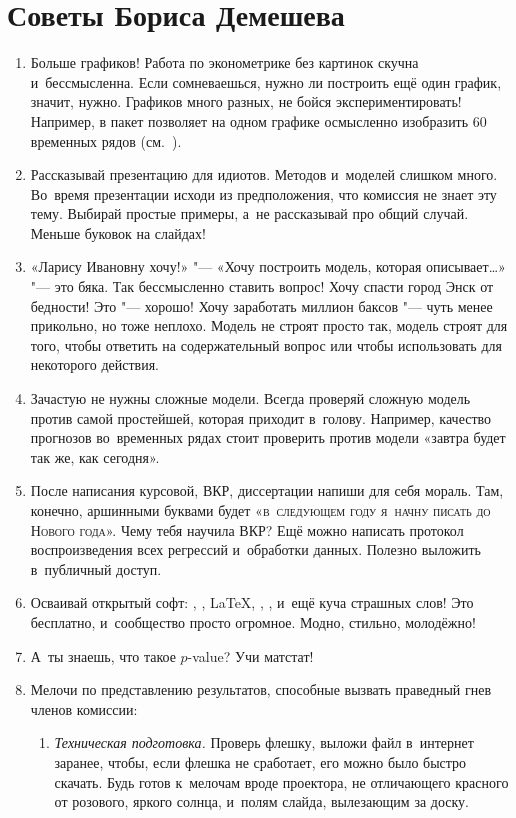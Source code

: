 \documentclass[11pt]{article}
\begin{document}
\section{Советы Бориса Демешева}

\begin{enumerate}
	\item Больше графиков! Работа по эконометрике без картинок скучна и~бессмысленна. Если сомневаешься, нужно ли построить ещё один график, значит, нужно. Графиков много разных, не бойся экспериментировать! Например, в  пакет  позволяет на одном графике  осмысленно изобразить 60 временных рядов (см.~\cite{mvtsplot}). 
	\item Рассказывай презентацию для идиотов. Методов и~моделей слишком много. Во~время презентации исходи из предположения, что комиссия не знает эту тему. Выбирай простые примеры, а~не рассказывай про общий случай. Меньше буковок на слайдах! 
	\item «Ларису Ивановну хочу!» "--- «Хочу построить модель, которая описывает\ldots» "--- это бяка. Так бессмысленно ставить вопрос! Хочу спасти город Энск от бедности! Это "--- хорошо! Хочу заработать миллион баксов "--- чуть менее прикольно, но тоже неплохо. Модель не строят просто так, модель строят для того, чтобы ответить на содержательный вопрос или чтобы использовать для некоторого действия.
	\item Зачастую не нужны сложные модели. Всегда проверяй сложную модель против самой простейшей, которая приходит в~голову. Например, качество прогнозов во~временных рядах стоит проверить против модели «завтра будет так же, как сегодня». 
	\item После написания курсовой, ВКР, диссертации напиши для себя мораль. Там, конечно, аршинными буквами будет «\textsc{в~следующем году я~начну писать до Нового года}». Чему тебя научила ВКР? Ещё можно написать протокол воспроизведения всех регрессий и~обработки данных. Полезно выложить в~публичный доступ. 
	\item Осваивай открытый софт: , , \LaTeX, , ,  и~ещё куча страшных слов! Это бесплатно, и~сообщество просто огромное. Модно, стильно, молодёжно! 
	\item А~ты знаешь, что такое $p$-value? Учи матстат! 
	\item Мелочи по представлению результатов, способные вызвать праведный гнев членов комиссии:
	\begin{enumerate}
		\item \textit{Техническая подготовка.} Проверь флешку, выложи файл в~интернет заранее, чтобы, если флешка не сработает, его можно было быстро скачать. Будь готов к~мелочам вроде проектора, не отличающего красного от розового, яркого солнца, и~полям слайда, вылезающим за доску. 

\end{enumerate}
\end{enumerate}
\end{document}
